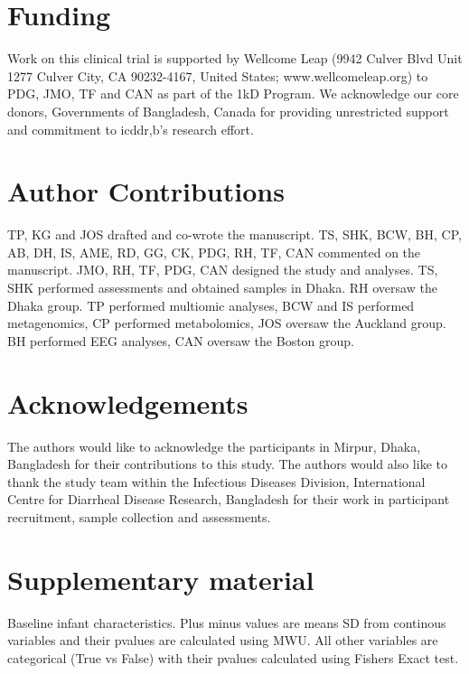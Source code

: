 \documentclass{article}
\begin{document}
\section*{Funding}
Work on this clinical trial is supported by Wellcome Leap (9942 Culver Blvd Unit 1277 Culver City, CA 90232-4167, United States; www.wellcomeleap.org) to PDG, JMO, TF and CAN as part of the 1kD Program.
We acknowledge our core donors, Governments of Bangladesh, Canada for providing unrestricted support and commitment to icddr,b's research effort.

\section*{Author Contributions}
TP, KG and JOS drafted and co-wrote the manuscript.
TS, SHK, BCW, BH, CP, AB, DH, IS, AME, RD, GG, CK, PDG, RH, TF, CAN commented on the manuscript.
JMO, RH, TF, PDG, CAN designed the study and analyses.
TS, SHK performed assessments and obtained samples in Dhaka.
RH oversaw the Dhaka group.
TP performed multiomic analyses, BCW and IS performed metagenomics, CP performed metabolomics, JOS oversaw the Auckland group.
BH performed EEG analyses, CAN oversaw the Boston group.

\section*{Acknowledgements}
The authors would like to acknowledge the participants in Mirpur, Dhaka, Bangladesh for their contributions to this study.
The authors would also like to thank the study team within the Infectious Diseases Division, International Centre for Diarrheal Disease Research, Bangladesh for their work in participant recruitment, sample collection and assessments.


\printbibliography

\section*{Supplementary material}

\begin{table}[!htb]
\centering
\caption[Baseline infant characteristics]{
	Baseline infant characteristics.
	Plus minus values are means \textpm{} SD from continous variables and their pvalues are calculated using \gls{MWU}.
	All other variables are categorical (True vs False) with their pvalues calculated using Fishers Exact test.}
%
\label{TableS1}
\end{table}
\end{document}
